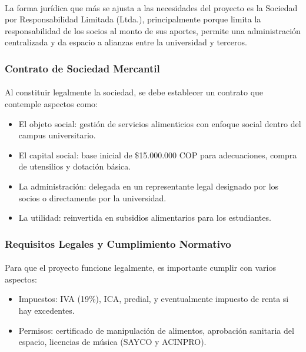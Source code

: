 \documentclass[letterpaper, 11pt]{report}
\begin{document}
\paragraph{}
La forma jurídica que más se ajusta a las necesidades del proyecto es la Sociedad por Responsabilidad Limitada (Ltda.), principalmente porque limita la responsabilidad de los socios al monto de sus aportes, permite una administración centralizada y da espacio a alianzas entre la universidad y terceros.

\subsubsection{Contrato de Sociedad Mercantil}
\paragraph{}
Al constituir legalmente la sociedad, se debe establecer un contrato que contemple aspectos como:
\begin{itemize}
      \item El objeto social: gestión de servicios alimenticios con enfoque social dentro del campus universitario.
      \item El capital social: base inicial de \$15.000.000 COP para adecuaciones, compra de utensilios y dotación básica.
      \item La administración: delegada en un representante legal designado por los socios o directamente por la universidad.
      \item La utilidad: reinvertida en subsidios alimentarios para los estudiantes.
\end{itemize}

\subsubsection{Requisitos Legales y Cumplimiento Normativo}
\paragraph{}
Para que el proyecto funcione legalmente, es importante cumplir con varios aspectos:
\begin{itemize}
      \item Impuestos: IVA (19\%), ICA, predial, y eventualmente impuesto de renta si hay excedentes.
      \item Permisos: certificado de manipulación de alimentos, aprobación sanitaria del espacio, licencias de música (SAYCO y ACINPRO).
\end{itemize}
\end{document}
